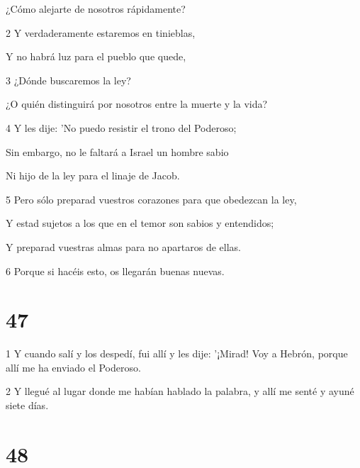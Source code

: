 \par ¿Cómo alejarte de nosotros rápidamente?

\par 2 Y verdaderamente estaremos en tinieblas,

Y no habrá luz para el pueblo que quede,

\par 3 ¿Dónde buscaremos la ley?

\par ¿O quién distinguirá por nosotros entre la muerte y la vida?

\par 4 Y les dije: 'No puedo resistir el trono del Poderoso;

\par Sin embargo, no le faltará a Israel un hombre sabio

Ni hijo de la ley para el linaje de Jacob.

\par 5 Pero sólo preparad vuestros corazones para que obedezcan la ley,

\par Y estad sujetos a los que en el temor son sabios y entendidos;

\par Y preparad vuestras almas para no apartaros de ellas.

\par 6 Porque si hacéis esto, os llegarán buenas nuevas.

\par [De lo que ya os hablé antes; ni caeréis en el tormento del que os he testificado antes.'

\par 7 Pero en cuanto a la palabra de que me iban a llevar, no se la comuniqué ni a ellos ni a mi hijo.]

\chapter{47}

\par 1 Y cuando salí y los despedí, fui allí y les dije: '¡Mirad! Voy a Hebrón, porque allí me ha enviado el Poderoso.

\par 2 Y llegué al lugar donde me habían hablado la palabra, y allí me senté y ayuné siete días.

\chapter{48}

